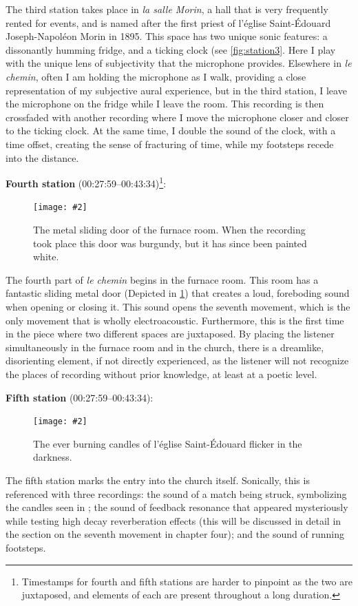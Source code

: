 \documentclass[12pt,twoside,maitrise]{dms_ks}
\newcommand{\customincludegraphics}[4][]{%
    \begin{figure}[H]
        \centering
        \texttt{[image: \#2]}
        \caption{#4}
	\label{#3} 
    \end{figure}
}
\theoremstyle{definition}
\begin{document}
{The third station takes place in \textit{la salle Morin}, a hall that is very frequently rented for events, and is named after the first priest of l'église Saint-Édouard Joseph-Napoléon Morin in 1895. 
This space has two unique sonic features: a dissonantly humming fridge, and a ticking clock (see \cref{fig:station3}. 
Here I play with the unique lens of subjectivity that the microphone provides. 
Elsewhere in \textit{le chemin}, often I am holding the microphone as I walk, providing a close representation of my subjective aural experience, but in the third station, I leave the microphone on the fridge while I leave the room. 
This recording is then crossfaded with another recording where I move the microphone closer and closer to the ticking clock. 
At the same time, I double the sound of the clock, with a time offset, creating the sense of fracturing of time, while my footsteps recede into the distance.

\textbf{Fourth station} (00:27:59--00:43:34)\footnote{Timestamps for fourth and fifth stations are harder to pinpoint as the two are juxtaposed, and elements of each are present throughout a long duration.}:

\customincludegraphics[scale=0.25]{DSC00157.JPG}{fig:station4}{The metal sliding door of the furnace room. When the recording took place this door was burgundy, but it has since been painted white.}%

The fourth part of \textit{le chemin} begins in the furnace room. 
This room has a fantastic sliding metal door (Depicted in \cref{fig:station4}) that creates a loud, foreboding sound when opening or closing it. 
This sound opens the seventh movement, which is the only movement that is wholly electroacoustic. 
Furthermore, this is the first time in the piece where two different spaces are juxtaposed. 
By placing the listener simultaneously in the furnace room and in the church, there is a dreamlike, disorienting element, if not directly experienced, as the listener will not recognize the places of recording without prior knowledge, at least at a poetic level.

\textbf{Fifth station} (00:27:59--00:43:34):

\customincludegraphics[scale=0.05]{candles.JPG}{station5}{The ever burning candles of l'église Saint-Édouard flicker in the darkness.}%

The fifth station marks the entry into the church itself. 
Sonically, this is referenced with three recordings: the sound of a match being struck, symbolizing the candles seen in ; the sound of feedback resonance that appeared mysteriously while testing high decay reverberation effects (this will be discussed in detail in the section on the seventh movement in chapter four); and the sound of running footsteps. 

}
\end{document}
